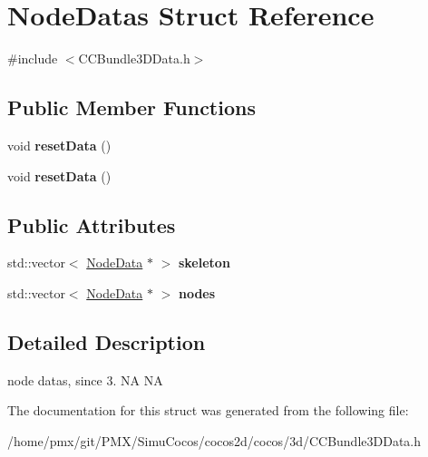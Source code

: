 \hypertarget{structNodeDatas}{}\section{Node\+Datas Struct Reference}
\label{structNodeDatas}


{\ttfamily \#include $<$C\+C\+Bundle3\+D\+Data.\+h$>$}

\subsection*{Public Member Functions}
\begin{DoxyCompactItemize}
\item 
\mbox{\label{structNodeDatas_aeafeae1ad42da8d01e52abd1e61ebc4c}} 
void {\bfseries reset\+Data} ()
\item 
\mbox{\label{structNodeDatas_aeafeae1ad42da8d01e52abd1e61ebc4c}} 
void {\bfseries reset\+Data} ()
\end{DoxyCompactItemize}
\subsection*{Public Attributes}
\begin{DoxyCompactItemize}
\item 
\mbox{\label{structNodeDatas_a8a2db29157f1d8e7c06769d2c6cb1608}} 
std\+::vector$<$ \hyperlink{structNodeData}{Node\+Data} $\ast$ $>$ {\bfseries skeleton}
\item 
\mbox{\label{structNodeDatas_a3c59cf21ea52b905eeeffcf84826ca89}} 
std\+::vector$<$ \hyperlink{structNodeData}{Node\+Data} $\ast$ $>$ {\bfseries nodes}
\end{DoxyCompactItemize}


\subsection{Detailed Description}
node datas, since 3.  NA  NA 

The documentation for this struct was generated from the following file\+:\begin{DoxyCompactItemize}
\item 
/home/pmx/git/\+P\+M\+X/\+Simu\+Cocos/cocos2d/cocos/3d/C\+C\+Bundle3\+D\+Data.\+h\end{DoxyCompactItemize}
